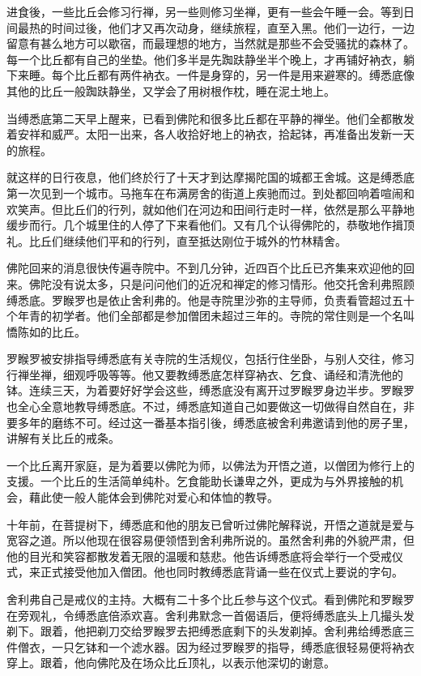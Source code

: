 \documentclass[12pt,twoside,openany]{book}
\begin{document}
进食後，一些比丘会修习行禅，另一些则修习坐禅，更有一些会午睡一会。等到日间最热的时间过後，他们才又再次动身，继续旅程，直至入黑。他们一边行，一边留意有甚么地方可以歇宿，而最理想的地方，当然就是那些不会受骚扰的森林了。每一个比丘都有自己的坐垫。他们多半是先踟趺静坐半个晚上，才再铺好衲衣，躺下来睡。每个比丘都有两件衲衣。一件是身穿的，另一件是用来避寒的。缚悉底像其他的比丘一般踟趺静坐，又学会了用树根作枕，睡在泥土地上。

当缚悉底第二天早上醒来，已看到佛陀和很多比丘都在平静的禅坐。他们全都散发着安祥和威严。太阳一出来，各人收拾好地上的衲衣，拾起钵，再准备出发新一天的旅程。

就这样的日行夜息，他们终於行了十天才到达摩揭陀国的城都王舍城。这是缚悉底第一次见到一个城市。马拖车在布满房舍的街道上疾驰而过。到处都回响着喧闹和欢笑声。但比丘们的行列，就如他们在河边和田间行走时一样，依然是那么平静地缓步而行。几个城里住的人停了下来看他们。又有几个认得佛陀的，恭敬地作揖顶礼。比丘们继续他们平和的行列，直至抵达刚位于城外的竹林精舍。

佛陀回来的消息很快传遍寺院中。不到几分钟，近四百个比丘已齐集来欢迎他的回来。佛陀没有说太多，只是问问他们的近况和禅定的修习情形。他交托舍利弗照顾缚悉底。罗睺罗也是依止舍利弗的。他是寺院里沙弥的主导师，负责看管超过五十个年青的初学者。他们全部都是参加僧团未超过三年的。寺院的常住则是一个名叫憍陈如的比丘。

罗睺罗被安排指导缚悉底有关寺院的生活规仪，包括行住坐卧，与别人交往，修习行禅坐禅，细观呼吸等等。他又要教缚悉底怎样穿衲衣、乞食、诵经和清洗他的钵。连续三天，为着要好好学会这些，缚悉底没有离开过罗睺罗身边半步。罗睺罗也全心全意地教导缚悉底。不过，缚悉底知道自己如要做这一切做得自然自在，非要多年的磨练不可。经过这一番基本指引後，缚悉底被舍利弗邀请到他的房子里，讲解有关比丘的戒条。

一个比丘离开家庭，是为着要以佛陀为师，以佛法为开悟之道，以僧团为修行上的支援。一个比丘的生活简单纯朴。乞食能助长谦卑之外，更成为与外界接触的机会，藉此使一般人能体会到佛陀对爱心和体恤的教导。

十年前，在菩提树下，缚悉底和他的朋友已曾听过佛陀解释说，开悟之道就是爱与宽容之道。所以他现在很容易便领悟到舍利弗所说的。虽然舍利弗的外貌严肃，但他的目光和笑容都散发着无限的温暖和慈悲。他告诉缚悉底将会举行一个受戒仪式，来正式接受他加入僧团。他也同时教缚悉底背诵一些在仪式上要说的字句。

舍利弗自己是戒仪的主持。大概有二十多个比丘参与这个仪式。看到佛陀和罗睺罗在旁观礼，令缚悉底倍添欢喜。舍利弗默念一首偈语后，便将缚悉底头上几撮头发剃下。跟着，他把剃刀交给罗睺罗去把缚悉底剩下的头发剃掉。舍利弗给缚悉底三件僧衣，一只乞钵和一个滤水器。因为经过罗睺罗的指导，缚悉底很轻易便将衲衣穿上。跟着，他向佛陀及在场众比丘顶礼，以表示他深切的谢意。
\end{document}
